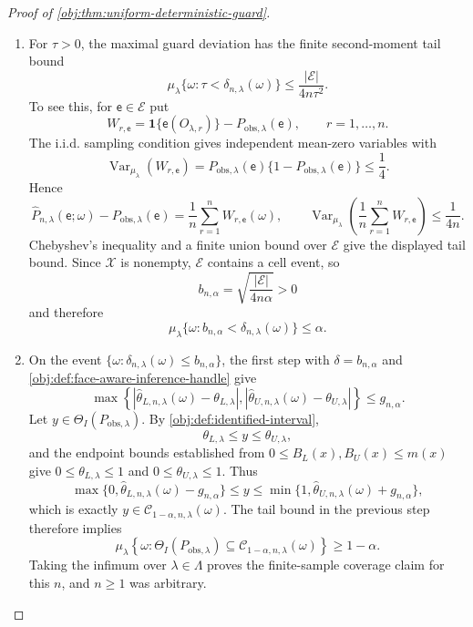 \begin{proof}[Proof of \cref{obj:thm:uniform-deterministic-guard}]
\begin{enumerate}
\item For \(\tau>0\), the maximal guard deviation has the finite second-moment
tail bound
\[
\mu_\lambda\{\omega:\tau<\delta_{n,\lambda}(\omega)\}
\le
\frac{|\mathcal E|}{4n\tau^2}.
\]
To see this, for \(\mathsf e\in\mathcal E\) put
\[
W_{r,\mathsf e}
=
\mathbf 1\{\mathsf e(O_{\lambda,r})\}
-
P_{\mathrm{obs},\lambda}(\mathsf e),
\qquad r=1,\ldots,n .
\]
The i.i.d. sampling condition gives independent mean-zero variables with
\[
\operatorname{Var}_{\mu_\lambda}(W_{r,\mathsf e})
=
P_{\mathrm{obs},\lambda}(\mathsf e)
\{1-P_{\mathrm{obs},\lambda}(\mathsf e)\}
\le \frac14.
\]
Hence
\[
\widehat P_{n,\lambda}(\mathsf e;\omega)
-
P_{\mathrm{obs},\lambda}(\mathsf e)
=
\frac1n\sum_{r=1}^n W_{r,\mathsf e}(\omega),
\qquad
\operatorname{Var}_{\mu_\lambda}\!\left(
\frac1n\sum_{r=1}^n W_{r,\mathsf e}
\right)
\le
\frac{1}{4n}.
\]
Chebyshev's inequality and a finite union bound over \(\mathcal E\) give the
displayed tail bound.
Since \(\mathcal X\) is nonempty, \(\mathcal E\) contains
a cell event, so
\[
b_{n,\alpha}
=
\sqrt{\frac{|\mathcal E|}{4n\alpha}}>0
\]
and therefore
\[
\mu_\lambda\{\omega:b_{n,\alpha}<\delta_{n,\lambda}(\omega)\}
\le
\alpha .
\]

\item On the event
\(\{\omega:\delta_{n,\lambda}(\omega)\le b_{n,\alpha}\}\), the first step with
\(\delta=b_{n,\alpha}\) and \cref{obj:def:face-aware-inference-handle} give
\[
\max\left\{
\left|\widehat\theta_{L,n,\lambda}(\omega)-\theta_{L,\lambda}\right|,
\left|\widehat\theta_{U,n,\lambda}(\omega)-\theta_{U,\lambda}\right|
\right\}
\le
g_{n,\alpha}.
\]
Let \(y\in\Theta_I(P_{\mathrm{obs},\lambda})\).  By
\cref{obj:def:identified-interval},
\[
\theta_{L,\lambda}\le y\le \theta_{U,\lambda},
\]
and the endpoint bounds established from \(0\le B_L(x),B_U(x)\le m(x)\) give
\(0\le\theta_{L,\lambda}\le1\) and \(0\le\theta_{U,\lambda}\le1\).  Thus
\[
\max\{0,\widehat\theta_{L,n,\lambda}(\omega)-g_{n,\alpha}\}
\le y
\le
\min\{1,\widehat\theta_{U,n,\lambda}(\omega)+g_{n,\alpha}\},
\]
which is exactly
\(y\in\mathcal C_{1-\alpha,n,\lambda}(\omega)\).  The tail bound in the previous
step therefore implies
\[
\mu_\lambda\!\left\{
\omega:
\Theta_I(P_{\mathrm{obs},\lambda})
\subseteq
\mathcal C_{1-\alpha,n,\lambda}(\omega)
\right\}
\ge
1-\alpha .
\]
Taking the infimum over \(\lambda\in\Lambda\) proves the finite-sample coverage
claim for this \(n\), and \(n\ge1\) was arbitrary.


\end{enumerate}
\end{proof}
